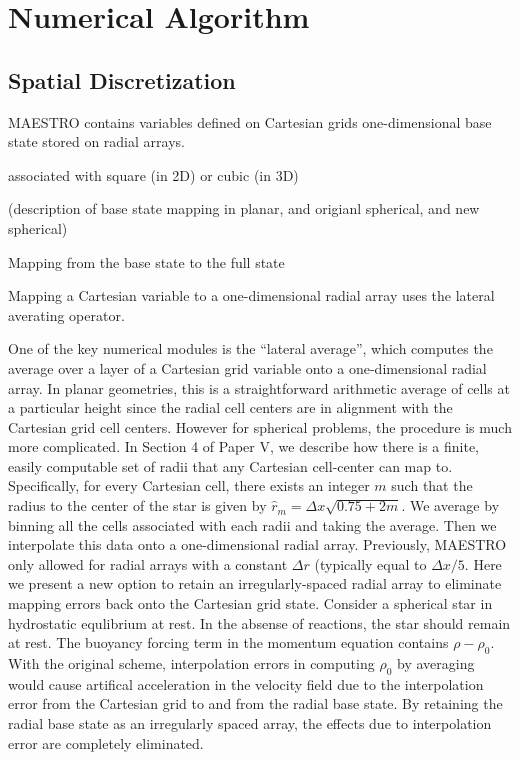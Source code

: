 \section{Numerical Algorithm}

\subsection{Spatial Discretization}\label{Sec:Spatial}
MAESTRO contains variables defined on Cartesian grids 
one-dimensional base state stored on radial arrays.

 associated with square (in 2D) or cubic (in 3D)


(description of base state mapping in planar, and origianl spherical, and new spherical)

Mapping from the base state to the full state

Mapping a Cartesian variable to a one-dimensional radial array uses the lateral averating operator.

One of the key numerical modules is the ``lateral average'', which computes the average over a 
layer of a Cartesian grid variable onto a one-dimensional radial array.
In planar geometries, this is a straightforward arithmetic average of cells at
a particular height since the radial cell centers are in alignment
with the Cartesian grid cell centers.
However for spherical problems, the procedure is much more complicated.
In Section 4 of Paper V, we describe how there is a finite, easily computable set of radii that any Cartesian cell-center can map to.  
Specifically, for every Cartesian cell, there exists an integer $m$ such that the radius to the center of the star is given by $\hat{r}_m=\Delta x\sqrt{0.75+2m}$.
We average by binning all the cells associated with each radii and taking the average.
Then we interpolate this data onto a one-dimensional radial array.  Previously, MAESTRO only allowed for radial arrays with a constant $\Delta r$ (typically equal to $\Delta x/5$.
Here we present a new option to retain an irregularly-spaced radial array to eliminate mapping errors back onto the Cartesian grid state.
Consider a spherical star in hydrostatic equlibrium at rest.  In the absense of reactions, the star should remain at rest.
The buoyancy forcing term in the momentum equation contains $\rho-\rho_0$.  With the original scheme, interpolation errors in computing $\rho_0$ by averaging would cause artifical acceleration in the velocity field due to the interpolation error from the Cartesian grid to and from the radial base state.  By retaining the radial base state as an irregularly spaced array, the effects due to interpolation error are completely eliminated.


